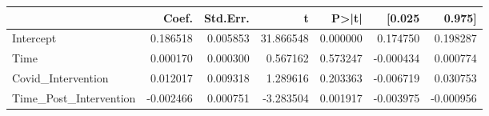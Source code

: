 \begin{tabular}{lrrrrrr}
\toprule
 & Coef. & Std.Err. & t & P>|t| & [0.025 & 0.975] \\
\midrule
Intercept & 0.186518 & 0.005853 & 31.866548 & 0.000000 & 0.174750 & 0.198287 \\
Time & 0.000170 & 0.000300 & 0.567162 & 0.573247 & -0.000434 & 0.000774 \\
Covid\_Intervention & 0.012017 & 0.009318 & 1.289616 & 0.203363 & -0.006719 & 0.030753 \\
Time\_Post\_Intervention & -0.002466 & 0.000751 & -3.283504 & 0.001917 & -0.003975 & -0.000956 \\
\bottomrule
\end{tabular}
